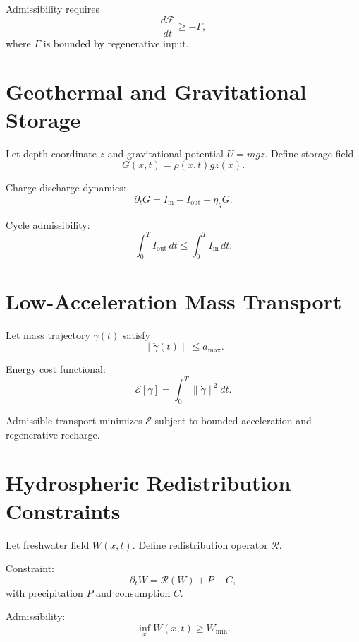 \documentclass[12pt,oneside]{book}
\begin{document}
Admissibility requires
\begin{equation}
\frac{d\mathcal{F}}{dt} \ge -\Gamma,
\end{equation}
where \(\Gamma\) is bounded by regenerative input.

\chapter{Geothermal and Gravitational Storage}

Let depth coordinate \(z\) and gravitational potential \(U = m g z\).
Define storage field
\[
G(x,t) = \rho(x,t) g z(x).
\]

Charge-discharge dynamics:
\begin{equation}
\partial_t G = I_{\text{in}} - I_{\text{out}} - \eta_g G.
\end{equation}

Cycle admissibility:
\begin{equation}
\int_0^T I_{\text{out}}\, dt \le \int_0^T I_{\text{in}}\, dt.
\end{equation}

\chapter{Low-Acceleration Mass Transport}

Let mass trajectory \(\gamma(t)\) satisfy
\[
\|\ddot{\gamma}(t)\| \le a_{\max}.
\]

Energy cost functional:
\begin{equation}
\mathcal{E}[\gamma] = \int_0^T \|\dot{\gamma}\|^2 dt.
\end{equation}

Admissible transport minimizes \(\mathcal{E}\) subject to bounded acceleration and regenerative recharge.

\chapter{Hydrospheric Redistribution Constraints}

Let freshwater field \(W(x,t)\).
Define redistribution operator \(\mathcal{R}\).

Constraint:
\begin{equation}
\partial_t W = \mathcal{R}(W) + P - C,
\end{equation}
with precipitation \(P\) and consumption \(C\).

Admissibility:
\begin{equation}
\inf_x W(x,t) \ge W_{\min}.
\end{equation}
\end{document}
